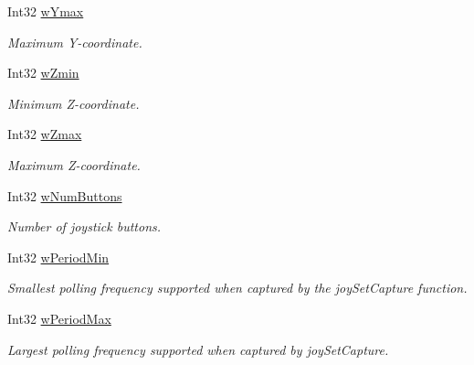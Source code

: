 \begin{DoxyCompactItemize}
Int32 \hyperlink{struct_tao_1_1_platform_1_1_windows_1_1_winmm_1_1_j_o_y_c_a_p_s_ae8505261b876eca98bffcaa9dd4759ff}{wYmax}
\begin{DoxyCompactList}\small\item\em Maximum Y-\/coordinate. \item\end{DoxyCompactList}\item 
Int32 \hyperlink{struct_tao_1_1_platform_1_1_windows_1_1_winmm_1_1_j_o_y_c_a_p_s_a9563d825a5274a0c8fb7a738ccc816c6}{wZmin}
\begin{DoxyCompactList}\small\item\em Minimum Z-\/coordinate. \item\end{DoxyCompactList}\item 
Int32 \hyperlink{struct_tao_1_1_platform_1_1_windows_1_1_winmm_1_1_j_o_y_c_a_p_s_ab3f82bb6e8fa918550bf349c30218ecc}{wZmax}
\begin{DoxyCompactList}\small\item\em Maximum Z-\/coordinate. \item\end{DoxyCompactList}\item 
Int32 \hyperlink{struct_tao_1_1_platform_1_1_windows_1_1_winmm_1_1_j_o_y_c_a_p_s_ae35c0f06295d93b62f9e670380873319}{wNumButtons}
\begin{DoxyCompactList}\small\item\em Number of joystick buttons. \item\end{DoxyCompactList}\item 
Int32 \hyperlink{struct_tao_1_1_platform_1_1_windows_1_1_winmm_1_1_j_o_y_c_a_p_s_ac54547f60453f0b4452157fa8916498f}{wPeriodMin}
\begin{DoxyCompactList}\small\item\em Smallest polling frequency supported when captured by the joySetCapture function. \item\end{DoxyCompactList}\item 
Int32 \hyperlink{struct_tao_1_1_platform_1_1_windows_1_1_winmm_1_1_j_o_y_c_a_p_s_a6337fb9e97e1d1666abdeadb4fdcfb46}{wPeriodMax}
\begin{DoxyCompactList}\small\item\em Largest polling frequency supported when captured by joySetCapture. \item\end{DoxyCompactList}\item 

\end{DoxyCompactItemize}
